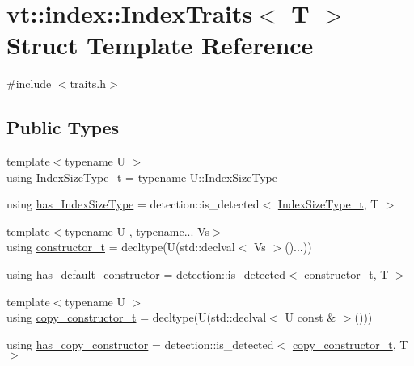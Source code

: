 \hypertarget{structvt_1_1index_1_1_index_traits}{}\section{vt\+:\+:index\+:\+:Index\+Traits$<$ T $>$ Struct Template Reference}
\label{structvt_1_1index_1_1_index_traits}


{\ttfamily \#include $<$traits.\+h$>$}

\subsection*{Public Types}
\begin{DoxyCompactItemize}
\item 
{\footnotesize template$<$typename U $>$ }\\using \hyperlink{structvt_1_1index_1_1_index_traits_a583a777d70fc52ccfe1083acabc9640f}{Index\+Size\+Type\+\_\+t} = typename U\+::\+Index\+Size\+Type
\item 
using \hyperlink{structvt_1_1index_1_1_index_traits_ad4433ee81a5b60b9d300efcec8b97181}{has\+\_\+\+Index\+Size\+Type} = detection\+::is\+\_\+detected$<$ \hyperlink{structvt_1_1index_1_1_index_traits_a583a777d70fc52ccfe1083acabc9640f}{Index\+Size\+Type\+\_\+t}, T $>$
\item 
{\footnotesize template$<$typename U , typename... Vs$>$ }\\using \hyperlink{structvt_1_1index_1_1_index_traits_a752bed91b021dff94a5b2863442e07c9}{constructor\+\_\+t} = decltype(U(std\+::declval$<$ Vs $>$()...))
\item 
using \hyperlink{structvt_1_1index_1_1_index_traits_a583c6d370e78ca2c8b9fc67bd2d1d942}{has\+\_\+default\+\_\+constructor} = detection\+::is\+\_\+detected$<$ \hyperlink{structvt_1_1index_1_1_index_traits_a752bed91b021dff94a5b2863442e07c9}{constructor\+\_\+t}, T $>$
\item 
{\footnotesize template$<$typename U $>$ }\\using \hyperlink{structvt_1_1index_1_1_index_traits_ad99299628a662db3cfa5021b810e8846}{copy\+\_\+constructor\+\_\+t} = decltype(U(std\+::declval$<$ U const  \& $>$()))
\item 
using \hyperlink{structvt_1_1index_1_1_index_traits_a7440b1a34592c08fcd93fd9a39ffbfa7}{has\+\_\+copy\+\_\+constructor} = detection\+::is\+\_\+detected$<$ \hyperlink{structvt_1_1index_1_1_index_traits_ad99299628a662db3cfa5021b810e8846}{copy\+\_\+constructor\+\_\+t}, T $>$

\end{DoxyCompactItemize}
